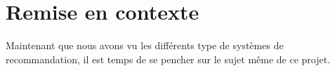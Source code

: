 \chapter{Remise en contexte}
    Maintenant que nous avons vu les différents type de systèmes de recommandation, il est temps de se pencher sur le sujet même de ce projet.\\
